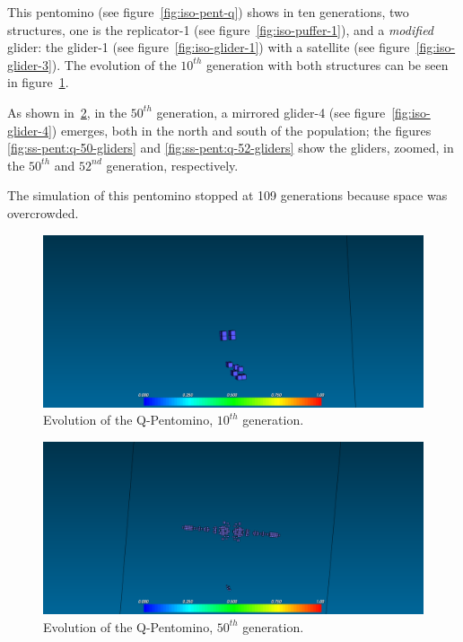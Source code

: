 This pentomino (see figure~\ref{fig:iso-pent-q}) shows in ten generations, two
structures, one is the replicator-1 (see figure~\ref{fig:iso-puffer-1}), and a
\textit{modified} glider: the glider-1 (see figure~\ref{fig:iso-glider-1}) with
a satellite (see figure~\ref{fig:iso-glider-3}). The evolution of the $10^{th}$
generation with both structures can be seen in figure~\ref{fig:ss-pent:q-10}.

As shown in~\ref{fig:ss-pent:q-50}, in the $50^{th}$ generation, a mirrored
glider-4 (see figure~\ref{fig:iso-glider-4}) emerges, both in the north and
south of the population; the figures \ref{fig:ss-pent:q-50-gliders} and
\ref{fig:ss-pent:q-52-gliders} show the gliders, zoomed, in the $50^{th}$ and
$52^{nd}$ generation, respectively.

The simulation of this pentomino stopped at 109 generations because space
was overcrowded.

\begin{figure}[H]
	\centering
	\includegraphics[scale=0.3]{pentominoes_ss/q_10.png}
	\caption{Evolution of the Q-Pentomino, $10^{th}$ generation.}
  \label{fig:ss-pent:q-10}
\end{figure}

\begin{figure}[H]
	\centering
	\includegraphics[scale=0.3]{pentominoes_ss/q_50.png}
	\caption{Evolution of the Q-Pentomino, $50^{th}$ generation.}
  \label{fig:ss-pent:q-50}
\end{figure}

